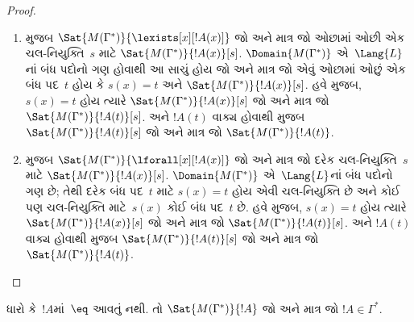 \begin{proof}
\begin{enumerate}
\item %
   મુજબ
    $\Sat{M(\Gamma^*)}{\lexists[x][!A(x)]}$ જો અને માત્ર જો ઓછામાં ઓછી
    એક ચલ-નિયુક્તિ~$s$ માટે $\Sat{M(\Gamma^*)}{!A(x)}[s]$.
    $\Domain{M(\Gamma^*)}$ એ~$\Lang{L}$નાં બંધ પદોનો ગણ હોવાથી આ સાચું
    હોય જો અને માત્ર જો એવું ઓછામાં ઓછું એક બંધ પદ~$t$ હોય કે
    $s(x)=t$ અને $\Sat{M(\Gamma^*)}{!A(x)}[s]$. હવે
     મુજબ, $s(x)=t$ હોય ત્યારે
    $\Sat{M(\Gamma^*)}{!A(x)}[s]$ જો અને માત્ર જો
    $\Sat{M(\Gamma^*)}{!A(t)}[s]$. અને $!A(t)$ વાક્ય હોવાથી
     મુજબ
    $\Sat{M(\Gamma^*)}{!A(t)}[s]$ જો અને માત્ર જો
    $\Sat{M(\Gamma^*)}{!A(t)}$.
\item %
   મુજબ
    $\Sat{M(\Gamma^*)}{\lforall[x][!A(x)]}$ જો અને માત્ર જો દરેક
    ચલ-નિયુક્તિ~$s$ માટે $\Sat{M(\Gamma^*)}{!A(x)}[s]$.
    $\Domain{M(\Gamma^*)}$ એ~$\Lang{L}$નાં બંધ પદોનો ગણ છે; તેથી દરેક
    બંધ પદ~$t$ માટે $s(x)=t$ હોય એવી ચલ-નિયુક્તિ છે અને કોઈ પણ
    ચલ-નિયુક્તિ માટે~$s(x)$ કોઈ બંધ પદ~$t$ છે. હવે
     મુજબ, $s(x)=t$ હોય ત્યારે
    $\Sat{M(\Gamma^*)}{!A(x)}[s]$ જો અને માત્ર જો
    $\Sat{M(\Gamma^*)}{!A(t)}[s]$. અને $!A(t)$ વાક્ય હોવાથી
     મુજબ
    $\Sat{M(\Gamma^*)}{!A(t)}[s]$ જો અને માત્ર જો
    $\Sat{M(\Gamma^*)}{!A(t)}$.
\end{enumerate}
\end{proof}



\begin{lem}[સત્યતા સહાયક પ્રમેય]
 ધારો કે~$!A$માં~$\eq$ આવતું નથી. તો
$\Sat{M(\Gamma^*)}{!A}$ જો અને માત્ર
જો $!A \in \Gamma^*$.
\end{lem}

